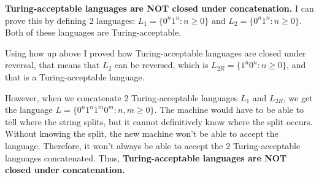\documentclass[12pt]{article}
\begin{document}
\begin{enumerate}
\color{blue}
    \textbf{Turing-acceptable languages are NOT closed under concatenation.} I can prove this by defining 2 languages: $L_1 = \{0^n1^n : n \geq 0\}$ and $L_2 = \{0^n1^n : n \geq 0\}$. Both of these languages are Turing-acceptable.

    Using how up above I proved how Turing-acceptable languages are closed under reversal, that means that $L_2$ can be reversed, which is $L_{2R} = \{1^n0^n : n \geq 0\}$, and that is a Turing-acceptable language.

    However, when we concatenate 2 Turing-acceptable languages $L_1$ and $L_{2R}$, we get the language $L = \{0^n1^n1^m0^m : n, m \geq 0\}$. The machine would have to be able to tell where the string splits, but it cannot definitively know where the split occurs. Without knowing the split, the new machine won't be able to accept the language. Therefore, it won't always be able to accept the 2 Turing-acceptable languages concatenated. Thus, \textbf{Turing-acceptable languages are NOT closed under concatenation.}
\color{black}


\end{enumerate}
\end{document}

